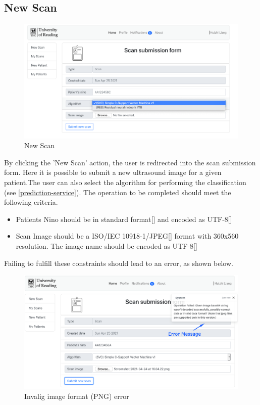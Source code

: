 		\subsection{New Scan}
			\begin{figure}[H]
				\iftrue
				\centering
				\caption{New Scan}
				\includegraphics[scale=0.3]{figures/newscan}
				\fi
			\end{figure}
			By clicking the 'New Scan' action, the user is redirected into the scan submission form. Here it is possible to 
			submit a new ultrasound image for a given patient.The user can also select the algorithm for performing the 
			classification (see \ref{prediction-service}). The operation to be completed should meet the following criteria.
			\begin{itemize}
				\item Patients Nino should be in standard format[\cite{nino-format}] and encoded as UTF-8[\cite{rfc3629}]
				\item Scan Image should be a ISO/IEC 10918-1/JPEG[\cite{jpeg-iso10918-1}] format with 360x560 resolution. The image name
				should be encoded as UTF-8[\cite{rfc3629}]
			\end{itemize}
			Failing to fulfill these constraints should lead to an error, as shown below.
			\begin{figure}[H]
				\iftrue
				\centering
				\caption{Invalig image format (PNG) error}
				\includegraphics[scale=0.3]{figures/newscan-error}
				\fi
			\end{figure}
			
			
			
			
			
			
			
		
	



